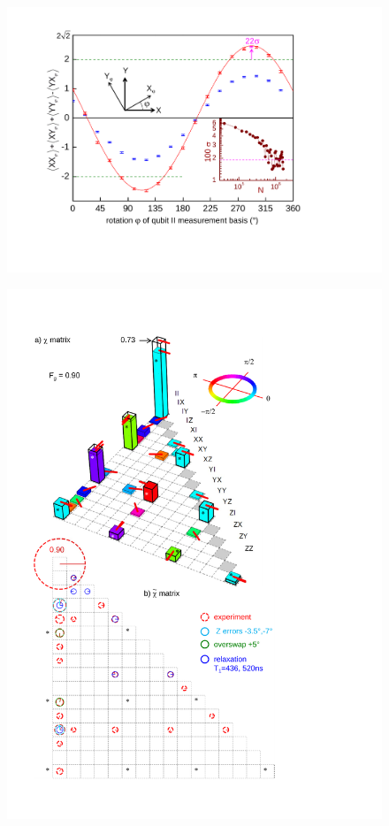 
\begin{figure}
	\centering
	\label{fig:iSwap1}
	\caption{}
\end{figure}

\begin{figure}
	\centering
		\includegraphics[width=1.\textwidth]{./material/papers/iswap/submission1/Dewes_Figure3}
	\label{fig:iSwap3}
	\caption{}
\end{figure}

\begin{figure}
	\centering
		\includegraphics[width=1.\textwidth]{./material/papers/iswap/submission1/Dewes_Figure4}
	\label{fig:iSwap4}
	\caption{}
\end{figure}
